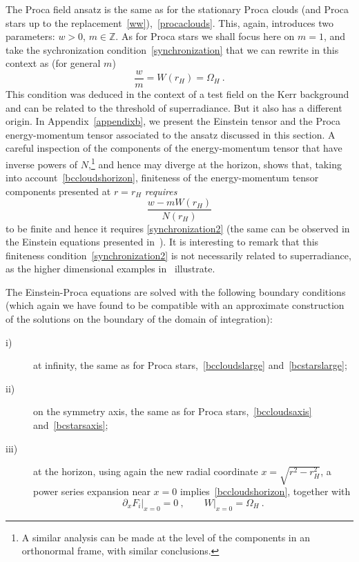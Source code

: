 \documentclass{article}
\numberwithin{equation}{section}
\begin{document}
The Proca field ansatz is the same as for the stationary Proca clouds (and Proca stars up to the replacement~\eqref{ww}),~\eqref{procaclouds}. This, again, introduces two parameters: $w>0$, $m\in \mathbb{Z}$. As for Proca stars we shall focus here on $m=1$, and take the sychronization condition~\eqref{synchronization} that we can rewrite in this context as (for general $m$)
\begin{equation}
\frac{w}{m}=W(r_H) =\Omega_H\ . 
\label{synchronization2}
\end{equation}
This condition was deduced in the context of a test field on the Kerr background and can be related to the threshold of superradiance. But it also has a different origin. In Appendix~\ref{appendixb}, we present the Einstein tensor and the Proca energy-momentum tensor associated to the ansatz discussed in this section. A careful inspection of the components of the energy-momentum tensor that have inverse powers of $N$,\footnote{A similar analysis can be made at the level of the components in an orthonormal frame, with similar conclusions.} and hence may diverge at the horizon, shows that, taking into account~\eqref{bccloudshorizon}, finiteness of the energy-momentum tensor components presented at $r=r_H$ \textit{requires}
\begin{equation}
\frac{w-mW(r_H)}{N(r_H)} 
\end{equation}
to be finite and hence it requires \eqref{synchronization2} (the same can be observed in the Einstein equations presented in~\cite{Herdeiro:2015gia}). It is interesting to remark that this finiteness condition~\eqref{synchronization2} is not necessarily related to superradiance, as the higher dimensional examples in~\cite{Brihaye:2014nba,Herdeiro:2015kha} illustrate. 




The Einstein-Proca equations are solved with the following boundary conditions (which again we have found to be compatible with an approximate construction of the solutions
on the boundary of the domain of integration):  
\begin{description}
\item[i)] at infinity, the same as for Proca stars,~\eqref{bccloudslarge} and~\eqref{bcstarslarge};
\item[ii)] on the symmetry axis, the same as for Proca stars,~\eqref{bccloudsaxis} and~\eqref{bcstarsaxis};
 
\item[iii)] at the horizon, using again the new radial coordinate $x=\sqrt{r^2-r_H^2}$, a power series expansion near $x=0$ implies~\eqref{bccloudshorizon}, together with
\begin{equation}
\partial_x F_i\big|_{x=0}=0 \ , \qquad W\big|_{x=0}=\Omega_H \ .
\end{equation}
\end{description}
 
\end{document}
